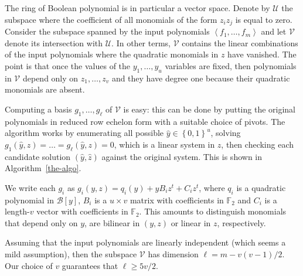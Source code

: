 \documentclass[a4paper,UKenglish,cleveref, autoref]{lipics-v2019}
\newcommand{\bits}{\left\{0, 1\right\}}
\newcommand{\red}{\color{red}}
\newcommand{\TODO}[1]{{\red \textbf{TODO}:} #1\xspace}
\begin{document}

The ring of Boolean polynomial is in particular a vector space. Denote by
$\mathcal{U}$ the subspace where the coefficient of all monomials of the form
$z_i z_j$ is equal to zero. Consider the subspace spanned by the input
polynomials $\left\langle f_1, \dots, f_m\right\rangle$ and let $\mathcal{V}$
denote its intersection with $\mathcal{U}$. In other terms, $\mathcal{V}$
contains the linear combinations of the input polynomials where the quadratic
monomials in $z$ have vanished. The point is that once the values of the
$y_1, \dots, y_u$ variables are fixed, then polynomials in $\mathcal{V}$ depend
only on $z_1, \dots, z_v$ and they have degree one because their quadratic
monomials are absent.

Computing a basis $g_1, \dots, g_\ell$ of $\mathcal{V}$ is easy: this can be
done by putting the original polynomials in reduced row echelon form with a
suitable choice of pivots. The algorithm works by enumerating all possible
$\hat y \in \bits^u$, solving $g_1(\hat y, z) = \dots = g_\ell(\hat y, z) = 0$,
which is a linear system in $z$, then checking each candidate solution
$(\hat y, \hat z)$ against the original system. This is shown in
Algorithm~\ref{the-algo}.

We write each $g_i$ as $g_i(y, z) = q_i(y) + y B_i z^t + C_i z^t$, where $q_i$
is a quadratic polynomial in $\mathcal{B}[y]$, $B_i$ is a $u \times v$ matrix
with coefficients in $\mathbb{F}_2$ and $C_i$ is a length-$v$ vector with
coefficients in $\mathbb{F}_2$. This amounts to distinguish monomials that
depend only on $y$, are bilinear in $(y, z)$ or linear in $z$, respectively.

Assuming that the input polynomials are linearly independent (which seems a mild
assumption), then the subspace $\mathcal{V}$ has dimension
$\ell = m - v(v-1)/2$. Our choice of $v$ guarantees that $\ell \geq 5v/2$.
\end{document}
